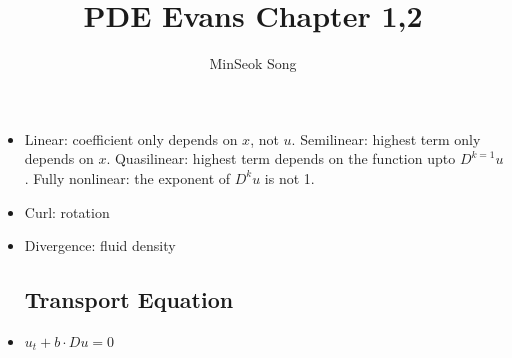 \documentclass{article}
\title{PDE Evans Chapter 1,2}
\author{MinSeok Song}
\date{}
\theoremstyle{remark}
\begin{document}
\maketitle 
\begin{itemize}
\item Linear: coefficient only depends on $x$, not $u$. Semilinear: highest term only depends on $x$. Quasilinear: highest term depends on the function upto $D^{k=1}u$. Fully nonlinear: the exponent of $D^k u$ is not 1.
\item Curl: rotation
\item Divergence: fluid density
\subsection*{Transport Equation}
\item $u_t+b\cdot Du=0$


\end{itemize}
\end{document}
